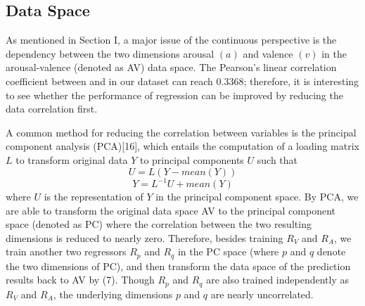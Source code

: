 \documentclass[journal, twoside]{IEEEtran}
\begin{document}
\subsection{Data Space}
As mentioned in Section I, a major issue of the continuous
perspective is the dependency between the two dimensions
arousal \((a)\) and valence \((v)\) in the arousal-valence (denoted as
AV) data space. The Pearson’s linear correlation coefficient
between and in our dataset can reach 0.3368; therefore, it is
interesting to see whether the performance of regression can be
improved by reducing the data correlation first.

A common method for reducing the correlation between variables is the principal component analysis (PCA)[16], which entails the computation of a loading matrix \(L\) to transform original data \(Y\) to principal components \(U\) such that
\begin{equation}
    U = L(Y - mean(Y))
\end{equation}
\begin{equation}
    Y=L^{-1}U + mean(Y)
\end{equation}
where \(U\) is the representation of \(Y\) in the principal component
space. By PCA, we are able to transform the original data space
AV to the principal component space (denoted as PC) where the
correlation between the two resulting dimensions is reduced to
nearly zero. Therefore, besides training \(R_V\) and \(R_A\), we train
another two regressors \(R_p\) and \(R_q\) in the PC space (where \(p\)
and \(q\) denote the two dimensions of PC), and then transform the
data space of the prediction results back to AV by (7). Though \(R_p\)
and \(R_q\) are also trained independently as \(R_V\) and \(R_A\), the
underlying dimensions \(p\) and \(q\) are nearly uncorrelated.
\end{document}
